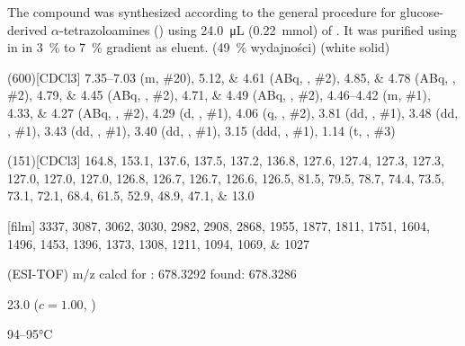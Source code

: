 The compound was synthesized according to the general procedure for glucose-derived $\alpha$-tetrazoloamines () using \SI{24.0}{\micro\liter} (\SI{0.22}{\milli\mol}) of .
It was purified using  in  in \SI{3}{\percent} to \SI{7}{\percent} gradient as eluent.
(\SI{49}{\percent} wydajności) (white solid)
\begin{fullexp}
	\NMR(600)[CDCl3] \numrange{7.35}{7.03} (m, \#{20}), \numlist{5.12;4.61} (ABq, , \#{2}), \numlist{4.85;4.78} (ABq, , \#{2}), \numlist{4.79;4.45} (ABq, , \#{2}), \numlist{4.71;4.49} (ABq, , \#{2}), \numrange{4.46}{4.42} (m, \#{1}), \numlist{4.33;4.27} (ABq, , \#{2}), \num{4.29} (d, , \#{1}), \num{4.06} (q, , \#{2}), \num{3.81} (dd, , \#{1}), \num{3.48} (dd, , \#{1}), \num{3.43} (dd, , \#{1}), \num{3.40} (dd, , \#{1}), \num{3.15} (ddd, , \#{1}), \num{1.14} (t, , \#{3})\par\noindent
	(151)[CDCl3] \numlist{164.8; 153.1; 137.6; 137.5; 137.2; 136.8; 127.6; 127.4; 127.3; 127.3; 127.0; 127.0; 127.0; 126.8; 126.7; 126.7; 126.6; 126.5; 81.5; 79.5; 78.7; 74.4; 73.5; 73.1; 72.1; 68.4; 61.5; 52.9; 48.9; 47.1; 13.0}\par\noindent
	[film] \numlist{3337; 3087; 3062; 3030; 2982; 2908; 2868; 1955; 1877; 1811; 1751; 1604; 1496; 1453; 1396; 1373; 1308; 1211; 1094; 1069; 1027}\par\noindent
	 (ESI-TOF) m/z calcd for : \num{678.3292} found: \num{678.3286}\par\noindent
	\data{[$\alpha^{23}_D$]~$=$} \num{23.0} ($c = 1.00$, )\par\noindent
	 \numrange{94}{95}\si{\celsius}
\end{fullexp}

